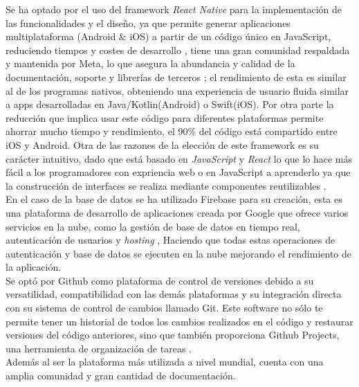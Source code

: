 \documentclass[12pt,a4paper]{report} %
\begin{document}
	Se ha optado por el uso del framework \textit{React Native} para la implementación de las funcionalidades y el diseño, ya que permite generar aplicaciones multiplataforma (Android \& iOS) a partir de un código único en JavaScript, reduciendo tiempos y costes de desarrollo \cite{reactNative}, tiene una gran comunidad respaldada y mantenida por Meta, lo que asegura la abundancia y calidad de la documentación, soporte y librerías de terceros \cite{reactNativeComnty}; el rendimiento de esta es similar al de los programas nativos, obteniendo una experiencia de usuario fluida similar a apps desarrolladas en Java/Kotlin(Android) o Swift(iOS)\cite{reactNativeRnd}. Por otra parte la reducción que implica usar este código para diferentes plataformas permite ahorrar mucho tiempo y rendimiento, el 90\% del código está compartido entre iOS y Android. Otra de las razones de la elección de este framework es su carácter intuitivo, dado que está basado en \textit{JavaScript} y \textit{React} lo que lo hace más fácil a los programadores con expriencia web o en JavaScript a aprenderlo ya que la construcción de interfaces se realiza mediante componentes reutilizables \cite{reactnative2025}.
	\\
	En el caso de la base de datos se ha utilizado Firebase para su creación, esta es una plataforma de desarrollo de aplicaciones creada por Google que ofrece varios servicios en la nube, como la gestión de base de datos en tiempo real, autenticación de usuarios y \textit{hosting} \cite{firebase}, Haciendo que todas estas operaciones de autenticación y base de datos se ejecuten en la nube mejorando el rendimiento de la aplicación.
	\\
	Se optó por Github como plataforma de control de versiones debido a su versatilidad, compatibilidad con las demás plataformas y su integración directa con su sistema de control de cambios llamado Git. Este software no sólo te permite tener un historial de todos los cambios realizados en el código y restaurar versiones del código anteriores, sino que también proporciona Github Projects, una herramienta de organización de tareas \cite{github2025}.\\
	Además al ser la plataforma más utilizada a nivel mundial, cuenta con una amplia comunidad y gran cantidad de documentación.
	
	
	
\end{document}
